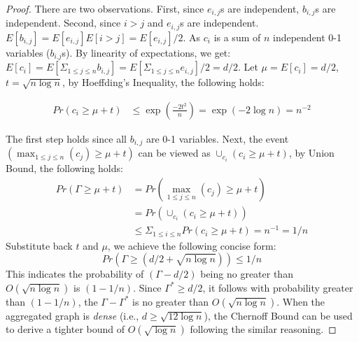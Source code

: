 \begin{proof}
There are two observations. First, since $e_{i,j}$s are independent,
$b_{i,j}$s are independent. Second, since $i>j$ and $e_{i,j}$s are independent. 
$E[b_{i,j}] = E[e_{i,j}]E[i>j]= E[e_{i,j}]/2$.
As $c_i$ is a sum of $n$ independent 0-1 variables ($b_{i.j}$s). By linearity 
of expectations,
we get: $E[c_i] = E[\Sigma_{1\leq j \leq n} b_{i,j}]=E[\Sigma_{1\leq j \leq n} e_{i,j}]/2 = d/2$.
 Let $\mu =E[c_i] = d/2$, 
$t = \sqrt{n\log n}$, by Hoeffding's Inequality, the following holds:

\begin{equation*}
\begin{split}
	Pr(c_i \geq \mu + t) &\leq \exp(\frac{-2t^2}{n}) = \exp(-2\log n) = n^{-2}
\end{split}
\end{equation*}

The first step holds since all $b_{i,j}$ are 0-1 variables. 
Next, the event $(\max_{1 \leq j \leq n}(c_j) \geq \mu + t)$ can be viewed as
$\cup_{c_i} (c_i \geq \mu + t )$, by Union Bound, the following holds:
\begin{equation*}
\begin{split}
	Pr(\Gamma \geq \mu + t) &=Pr(\max_{1\leq j \leq n}(c_j) \geq \mu + t)  \\
		& = Pr(\cup_{c_i} (c_i \geq \mu + t )) \\
		&\leq \Sigma_{1 \leq i \leq n} Pr(c_i \geq \mu + t) = n^{-1} = 1/n
\end{split}
\end{equation*}
Substitute back $t$ and $\mu$, we achieve the following concise form:
\begin{equation*}
	Pr(\Gamma \geq (d/2 + \sqrt{n\log n})) \leq 1/n
\end{equation*}
This indicates the probability of $(\Gamma-d/2)$ being no greater than $ O(\sqrt{n\log n})$ is $(1-1/n)$. 
Since $\Gamma^* \geq d/2$, it follows with probability greater than $(1-1/n)$, 
the $\Gamma - \Gamma^*$ is no greater than $O(\sqrt{n\log n})$.
When the aggregated graph is \emph{dense} (i.e., $d\geq \sqrt{12 \log n}$),
the Chernoff Bound can be used to derive a tighter bound of 
$O(\sqrt{\log n}) $ following the similar reasoning.
\end{proof}

